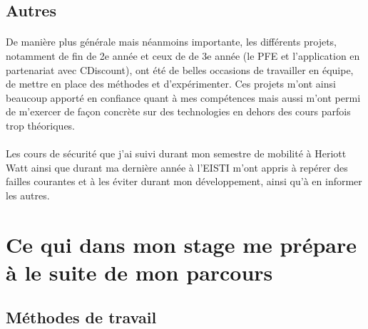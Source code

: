 \subsection{Autres}
\label{sub:Autres}
\paragraph{}
De manière plus générale mais néanmoins importante, les différents projets, notamment de fin de 2e année et ceux de de 3e année (le PFE et l'application en partenariat avec CDiscount), ont été de belles occasions de travailler en équipe, de mettre en place des méthodes et d'expérimenter.
Ces projets m'ont ainsi beaucoup apporté en confiance quant à mes compétences mais aussi m'ont permi de m'exercer de façon concrète sur des technologies en dehors des cours parfois trop théoriques.
\paragraph{}
Les cours de sécurité que j'ai suivi durant mon semestre de mobilité à Heriott Watt ainsi que durant ma dernière année à l'EISTI m'ont appris à repérer des failles courantes et à les éviter durant mon développement, ainsi qu'à en informer les autres.

\section{Ce qui dans mon stage me prépare à le suite de mon parcours}
\subsection{Méthodes de travail}
\label{sub:Méthodes de travail}
